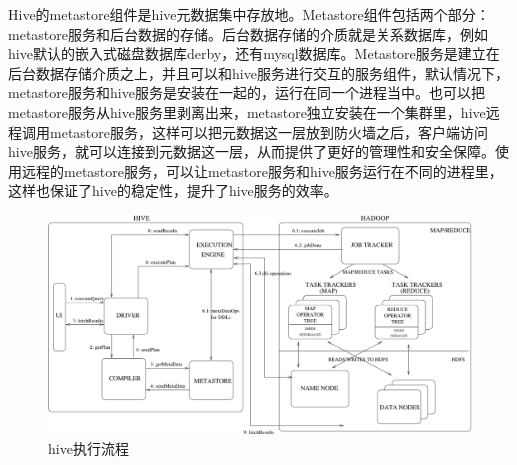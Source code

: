 \par Hive的metastore组件是hive元数据集中存放地。Metastore组件包括两个部分：metastore服务和后台数据的存储。后台数据存储的介质就是关系数据库，例如hive默认的嵌入式磁盘数据库derby，还有mysql数据库。Metastore服务是建立在后台数据存储介质之上，并且可以和hive服务进行交互的服务组件，默认情况下，metastore服务和hive服务是安装在一起的，运行在同一个进程当中。也可以把metastore服务从hive服务里剥离出来，metastore独立安装在一个集群里，hive远程调用metastore服务，这样可以把元数据这一层放到防火墙之后，客户端访问hive服务，就可以连接到元数据这一层，从而提供了更好的管理性和安全保障。使用远程的metastore服务，可以让metastore服务和hive服务运行在不同的进程里，这样也保证了hive的稳定性，提升了hive服务的效率。
\begin{figure}[htbp]
\centering\includegraphics[width=\linewidth]{figures/hive-2.png}
\caption{hive执行流程}\label{fig-hive-2}
\end{figure} 

